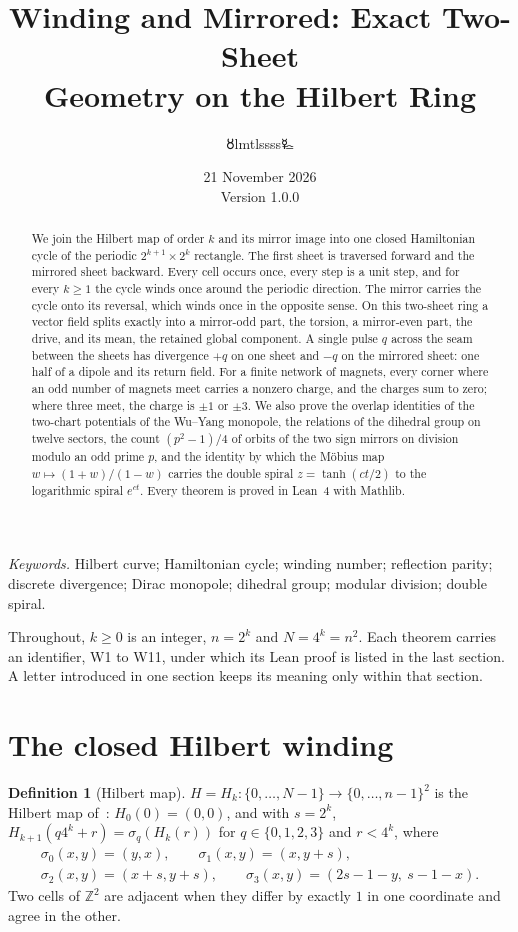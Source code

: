 \documentclass[11pt,a4paper]{article}
\title{\LARGE Winding and Mirrored: Exact Two-Sheet\\Geometry on the Hilbert Ring}
\author{{\authorsymbol 🜘}lmtlssss{\authorsymbol 🜐}}
\date{21 November 2026\\[3pt]\small Version 1.0.0}
\theoremstyle{definition}
\newtheorem{definition}{Definition}[section]
\newcommand{\Z}{\mathbb Z}
\begin{document}
\maketitle\thispagestyle{plain}
\begin{abstract}
We join the Hilbert map of order $k$ and its mirror image into one closed Hamiltonian cycle of the periodic $2^{k+1}\times2^k$ rectangle. The first sheet is traversed forward and the mirrored sheet backward. Every cell occurs once, every step is a unit step, and for every $k\ge1$ the cycle winds once around the periodic direction. The mirror carries the cycle onto its reversal, which winds once in the opposite sense. On this two-sheet ring a vector field splits exactly into a mirror-odd part, the torsion, a mirror-even part, the drive, and its mean, the retained global component. A single pulse $q$ across the seam between the sheets has divergence $+q$ on one sheet and $-q$ on the mirrored sheet: one half of a dipole and its return field. For a finite network of magnets, every corner where an odd number of magnets meet carries a nonzero charge, and the charges sum to zero; where three meet, the charge is $\pm1$ or $\pm3$. We also prove the overlap identities of the two-chart potentials of the Wu--Yang monopole, the relations of the dihedral group on twelve sectors, the count $(p^2-1)/4$ of orbits of the two sign mirrors on division modulo an odd prime $p$, and the identity by which the Möbius map $w\mapsto(1+w)/(1-w)$ carries the double spiral $z=\tanh(ct/2)$ to the logarithmic spiral $e^{ct}$. Every theorem is proved in Lean~4 with Mathlib.
\end{abstract}
\noindent\textit{Keywords.} Hilbert curve; Hamiltonian cycle; winding number; reflection parity; discrete divergence; Dirac monopole; dihedral group; modular division; double spiral.

\medskip\noindent
Throughout, $k\ge0$ is an integer, $n=2^k$ and $N=4^k=n^2$. Each theorem carries an identifier, W1 to W11, under which its Lean proof is listed in the last section. A letter introduced in one section keeps its meaning only within that section.

\section{The closed Hilbert winding}
\begin{definition}[Hilbert map]\label{def:hilbert}
$H=H_k:\{0,\ldots,N-1\}\to\{0,\ldots,n-1\}^2$ is the Hilbert map of~\cite[Definition~6.1]{unifier}: $H_0(0)=(0,0)$, and with $s=2^k$, $H_{k+1}(q4^k+r)=\sigma_q(H_k(r))$ for $q\in\{0,1,2,3\}$ and $r<4^k$, where
\begin{gather*}
\sigma_0(x,y)=(y,x),\qquad\sigma_1(x,y)=(x,y+s),\\
\sigma_2(x,y)=(x+s,y+s),\qquad\sigma_3(x,y)=(2s-1-y,\ s-1-x).
\end{gather*}
Two cells of $\Z^2$ are adjacent when they differ by exactly $1$ in one coordinate and agree in the other.
\end{definition}
\end{document}
